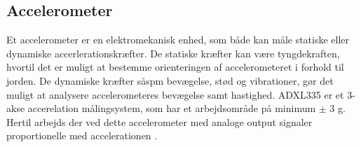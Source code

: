 \subsection{Accelerometer}
Et accelerometer er en elektromekanisk enhed, som både kan måle statiske eller dynamiske accerlerationskræfter. De statiske kræfter kan være tyngdekraften, hvortil det er muligt at bestemme orienteringen af accelerometeret i forhold til jorden. De dynamiske kræfter såspm bevægelse, stød og vibrationer, gør det muligt at analysere accelerometeres bevægelse samt hastighed. 
ADXL335 er et 3-akse accerelation målingsystem, som har et arbejdsområde på minimum $\pm$ 3 g. Hertil arbejds der ved dette accelerometer med analoge output signaler proportionelle med accelerationen \citep{analogdevices2010}. 






